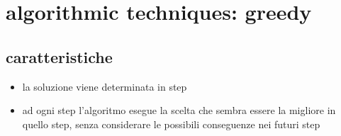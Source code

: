 \section*{algorithmic techniques: greedy}


\subsection*{caratteristiche}
\begin{flushleft}
	\begin{itemize}
		\item la soluzione viene determinata in step
		\item ad ogni step l'algoritmo esegue la scelta che sembra essere la migliore in quello step, senza considerare le possibili conseguenze nei futuri step
	\end{itemize}
\end{flushleft}


